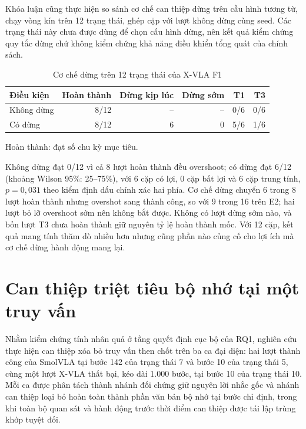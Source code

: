 Khóa luận cũng thực hiện so sánh cơ chế can thiệp dừng trên cầu hình tương từ, chạy vòng kín trên 12 trạng thái, ghép cặp với lượt không dừng cùng seed. Các trạng thái này chưa được dùng để chọn cấu hình dừng, nên kết quả kiểm chứng quy tắc dừng chứ không kiểm chứng khả năng điều khiển tổng quát của chính sách.

\begin{table}[htbp]
\centering\small
\caption{Cơ chế dừng trên 12 trạng thái của X-VLA F1}
\label{tab:halt-seen12}
\begin{tabular}{|l|r|r|r|r|r|}
\hline
\textbf{Điều kiện} & \textbf{Hoàn thành} & \textbf{Dừng kịp lúc} & \textbf{Dừng sớm} & \textbf{T1} & \textbf{T3} \\ \hline
Không dừng & 8/12 & -- & -- & 0/6 & 0/6 \\ \hline
Có dừng & 8/12 & 6 & 0 & 5/6 & 1/6 \\ \hline
\end{tabular}
\par\smallskip
{\footnotesize *Hoàn thành: đạt số chu kỳ mục tiêu.\par}
\end{table}

Không dừng đạt 0/12 vì cả 8 lượt hoàn thành đều overshoot; có dừng đạt 6/12 (khoảng Wilson 95\%: 25--75\%), với 6 cặp có lợi, 0 cặp bất lợi và 6 cặp trung tính, $p = 0{,}031$ theo kiểm định dấu chính xác hai phía. Cơ chế dừng chuyển 6 trong 8 lượt hoàn thành nhưng overshot sang thành công, so với 9 trong 16 trên E2; hai lượt bỏ lỡ overshoot sớm nên không bắt được. Không có lượt dừng sớm nào, và bốn lượt T3 chưa hoàn thành giữ nguyên tỷ lệ hoàn thành mốc. Với 12 cặp, kết quả mang tính thăm dò nhiều hơn nhưng cũng phần nào củng cố cho lợi ích mà cơ chế dừng hành động mang lại.

\section{Can thiệp triệt tiêu bộ nhớ tại một truy vấn}
\label{sec:e45-one-query}

Nhằm kiểm chứng tính nhân quả ở tầng quyết định cục bộ của RQ1, nghiên cứu thực hiện can thiệp xóa bỏ truy vấn then chốt trên ba ca đại diện: hai lượt thành công của SmolVLA tại bước 142 của trạng thái 7 và bước 10 của trạng thái 5, cùng một lượt X-VLA thất bại, kéo dài 1.000 bước, tại bước 10 của trạng thái 10. Mỗi ca được phân tách thành nhánh đối chứng giữ nguyên lời nhắc gốc và nhánh can thiệp loại bỏ hoàn toàn thành phần văn bản bộ nhớ tại bước chỉ định, trong khi toàn bộ quan sát và hành động trước thời điểm can thiệp được tái lập trùng khớp tuyệt đối.

